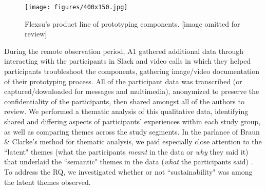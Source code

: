 \documentclass[manuscript,review,anonymous]{acmart}
\begin{document}
\begin{figure}[ht]
    \centering
    \texttt{[image: figures/400x150.jpg]}
    \caption{Flexsu's product line of prototyping components. [image omitted for review]}
    \label{fig:prototyping-components}
\end{figure}

During the remote observation period, A1 gathered additional data through interacting with the participants in Slack and video calls in which they helped participants troubleshoot the components, gathering image/video documentation of their prototyping process.
All of the participant data was transcribed (or captured/downloaded for messages and multimedia), anonymized to preserve the confidentiality of the participants, then shared amongst all of the authors to review. We performed a thematic analysis of this qualitative data, identifying shared and differing aspects of participants' experiences within each study group, as well as comparing themes across the study segments. In the parlance of Braun \& Clarke's method for thematic analysis, we paid especially close attention to the ``latent" themes (what the participants \textit{meant} in the data or \textit{why} they said it) that underlaid the ``semantic" themes in the data (\textit{what} the participants said) \cite{braun_using_2006, maguire_doing_2017}. To address the RQ, we investigated whether or not ``sustainability" was among the latent themes observed.



\end{document}
